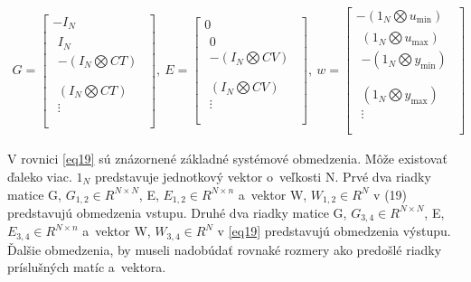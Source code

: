 \begin{equation} \label{eq19}
\begin{split}
G = \begin{bmatrix}
{- I}_{N} \\
\begin{matrix}
I_{N} \\
 - (I_{N}\bigotimes CT) \\
\end{matrix} \\
\begin{matrix}
(I_{N}\bigotimes CT) \\
 \vdots \\
\end{matrix} \\
\end{bmatrix},\ E = \begin{bmatrix}
0 \\
\begin{matrix}
0 \\
 - (I_{N}\bigotimes CV) \\
\end{matrix} \\
\begin{matrix}
(I_{N}\bigotimes CV) \\
 \vdots \\
\end{matrix} \\
\end{bmatrix},\ w = \begin{bmatrix}
 - (1_{N}\bigotimes u_{\min}) \\
\begin{matrix}
(1_{N}\bigotimes u_{\max}) \\
 - (1_{N}\bigotimes y_{\min}) \\
\end{matrix} \\
\begin{matrix}
(1_{N}\bigotimes y_{\max}) \\
 \vdots \\
\end{matrix} \\
\end{bmatrix}
\end{split}
\end{equation}

V rovnici \ref{eq19} sú znázornené základné systémové obmedzenia. Môže
existovať ďaleko viac. \(1_{N}\) predstavuje jednotkový vektor
o~veľkosti N. Prvé dva riadky matice G, \(G_{1,2} \in R^{N \times N}\),
E, \(E_{1,2} \in R^{N \times n}\) a~vektor W, \(W_{1,2} \in R^{N}\) v
(19) predstavujú obmedzenia vstupu. Druhé dva riadky matice G,
\(G_{3,4} \in R^{N \times N}\), E, \(E_{3,4} \in R^{N \times n}\)
a~vektor W, \(W_{3,4} \in R^{N}\) v \ref{eq19} predstavujú obmedzenia výstupu.
Ďalšie obmedzenia, by museli nadobúdať rovnaké rozmery ako predošlé
riadky príslušných matíc a~vektora.

